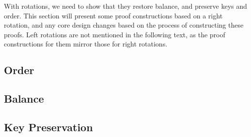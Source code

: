 With rotations, we need to show that they restore balance, and preserve keys and order. This section will present some proof constructions based on a right rotation, and any core design changes based on the process of constructing these proofs. Left rotations are not mentioned in the following text, as the proof constructions for them mirror those for right rotations.

\subsection*{Order}


\subsection*{Balance}


\subsection*{Key Preservation}
